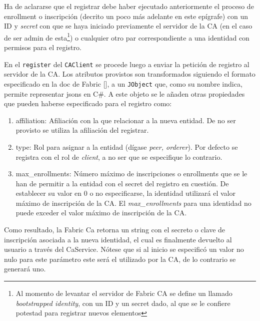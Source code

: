 Ha de aclararse que el registrar debe haber ejecutado anteriormente el proceso de enrollment o inscripci\'on (decrito un poco m\'as adelante en este ep\'igrafe) con un ID y \emph{secret} con que se haya iniciado previamente el servidor de la CA (en el caso de ser admin de esta\footnote{Al momento de levantar el servidor de Fabric CA se define un llamado \emph{bootstrapped identity}, con un ID y un secret dado, al que se le confiere potestad para registrar nuevos elementos}) o cualquier otro par correspondiente a una identidad con permisos para el registro.%

En el \texttt{register} del \texttt{CAClient} se procede luego a enviar la petici\'on de registro al servidor de la CA. Los atributos provistos son transformados siguiendo el formato especificado en la doc de Fabric [\cite{hlfcaswagger}], a un \texttt{JObject} que, como su nombre indica, permite representar jsons en C\#. A este objeto se le a\~naden otras propiedades que pueden haberse especificado para el registro como:

\begin{enumerate}
	\item affiliation: Afiliaci\'on con la que relacionar a la nueva entidad. De no ser provisto se utiliza la afiliaci\'on del registrar.
	
	\item type: Rol para asignar a la entidad (d\'igase \emph{peer, orderer}). Por defecto se registra con el rol de \emph{client}, a no ser que se especifique lo contrario.
	
	\item max\_enrollments: N\'umero m\'aximo de inscripciones o enrollments que se le han de permitir a la entidad con el secret del registro en cuesti\'on. De establecer su valor en 0 o no especificarse, la identidad utilizar\'a el valor máximo de inscripción de la CA. El \emph{max\_enrollments} para una identidad no puede exceder el valor máximo de inscripción de la CA.
	
\end{enumerate}


Como resultado, la Fabric Ca retorna un string con el secreto o clave de inscripci\'on asociada a la nueva identidad, el cual es finalmente devuelto al usuario a trav\'es del CaService. N\'otese que si al inicio se especific\'o un valor no nulo para este par\'ametro este ser\'a el utilizado por la CA, de lo contrario se generar\'a uno. 

